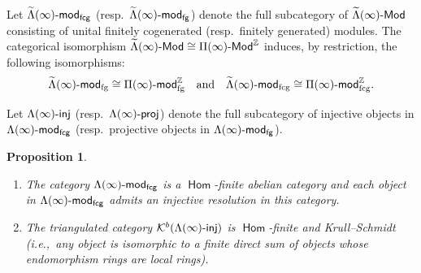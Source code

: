 \documentclass[12pt]{amsart}
\newtheorem{proposition}[theorem]{Proposition}
\theoremstyle{definition}
\theoremstyle{remark}
\numberwithin{equation}{section}
\newcommand{\opname}[1]{\operatorname{\mathsf{#1}}}
\newcommand{\Hom}{\opname{Hom}}
\newcommand{\ie}{\textit{i.e.,}\ }
\newcommand{\injc}{\mathchar`-\mathsf{inj}}
\newcommand{\projc}{\mathchar`-\mathsf{proj}}
\newcommand{\modfg}{\mathchar`-\mathsf{mod}_{\mathrm{fg}}}
\newcommand{\modfcg}{\mathchar`-\mathsf{mod}_{\mathrm{fcg}}}
\newcommand{\Mod}{\mathchar`-\mathsf{Mod}}
\begin{document}
     \vspace{1.5mm}
Let $\widetilde \Lambda(\infty)\mathchar`-\mathsf{mod}_\mathsf{fcg}$ (resp.\ $\widetilde \Lambda(\infty)\mathchar`-\mathsf{mod}_\mathsf{fg}$) denote the full subcategory of $\widetilde \Lambda(\infty)\mathchar`-\mathsf{Mod}$ consisting of unital finitely cogenerated (resp.\ finitely generated) modules. The categorical isomorphism $\widetilde{\Lambda}(\infty)\Mod \cong \Pi(\infty)\Mod^\mathbb{Z}$ induces, by restriction, the following isomorphisms:
\[
\widetilde{\Lambda}(\infty)\modfg\cong \Pi(\infty)\modfg^{\mathbb{Z}}\quad \text{and}\quad \widetilde{\Lambda}(\infty)\modfcg\cong \Pi(\infty)\modfcg^{\mathbb{Z}}.
\]


Let $\Lambda(\infty)\injc$ (resp.\ $\Lambda(\infty)\projc$) denote the full subcategory of injective objects in $\Lambda(\infty)\mathchar`-\mathsf{mod}_\mathsf{fcg}$ (resp.\ projective objects in $\Lambda(\infty)\mathchar`-\mathsf{mod}_\mathsf{fg}$).
\begin{proposition}\label{Prop:KS}
    \begin{enumerate}
        \item[(i)]\label{eq:KS1} The category $\Lambda(\infty)\mathchar`-\mathsf{mod}_\mathsf{fcg}$ is a $\Hom$-finite abelian category and each object in $\Lambda(\infty)\mathchar`-\mathsf{mod}_\mathsf{fcg}$ admits an injective resolution in this category.
        \item[(ii)]\label{eq:KS2} The triangulated category $\mathcal{K}^b(\Lambda(\infty)\injc)$ is $\Hom$-finite and Krull--Schmidt (\ie any object is isomorphic to a finite direct sum of objects whose endomorphism rings are local rings).
    \end{enumerate}
\end{proposition}
\end{document}
